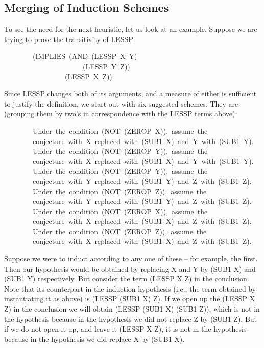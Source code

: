 \documentclass[10pt]{book}
\newenvironment{pubasis}{\begin{flushleft}}{\end{flushleft}}
\begin{document}
\subsection{Merging of Induction Schemes}
To see the need for the next heuristic, let us look at an
example.  Suppose we are trying to prove the transitivity of LESSP:
\begin{pubasis}
~~~~~~~~(IMPLIES~(AND~(LESSP~X~Y)\\
~~~~~~~~~~~~~~~~~~~~~~(LESSP~Y~Z))\\
~~~~~~~~~~~~~~~~~(LESSP~X~Z)).\\
\end{pubasis}
Since LESSP changes both of its arguments, and a measure of either is sufficient to
justify the definition, we start out with six suggested schemes.
They are (grouping them by two's in correspondence with the
LESSP terms above):
\begin{pubasis}
~~~~~~~~Under~the~condition~(NOT~(ZEROP~X)),~assume~the\\
~~~~~~~~conjecture~with~X~replaced~with~(SUB1~X)~and~Y~with~(SUB1~Y).\\

~~~~~~~~Under~the~condition~(NOT~(ZEROP~Y)),~assume~the\\
~~~~~~~~conjecture~with~X~replaced~with~(SUB1~X)~and~Y~with~(SUB1~Y).\\

~~~~~~~~Under~the~condition~(NOT~(ZEROP~Y)),~assume~the\\
~~~~~~~~conjecture~with~Y~replaced~with~(SUB1~Y)~and~Z~with~(SUB1~Z).\\

~~~~~~~~Under~the~condition~(NOT~(ZEROP~Z)),~assume~the\\
~~~~~~~~conjecture~with~Y~replaced~with~(SUB1~Y)~and~Z~with~(SUB1~Z).\\

~~~~~~~~Under~the~condition~(NOT~(ZEROP~X)),~assume~the\\
~~~~~~~~conjecture~with~X~replaced~with~(SUB1~X)~and~Z~with~(SUB1~Z).\\

~~~~~~~~Under~the~condition~(NOT~(ZEROP~Z)),~assume~the\\
~~~~~~~~conjecture~with~X~replaced~with~(SUB1~X)~and~Z~with~(SUB1~Z).\\
\end{pubasis}
Suppose we were to induct according to any one of these -- for
example, the first.  Then our hypothesis would be obtained by replacing
X and Y by (SUB1 X) and (SUB1 Y) respectively.  But consider
the term (LESSP X Z) in the conclusion.  Note that its counterpart in the
induction hypothesis (i.e., the term obtained by instantiating
it as above) is (LESSP (SUB1 X) Z).  If we open  up the (LESSP X Z) in the conclusion
we will obtain (LESSP (SUB1 X) (SUB1 Z)), which is not in the hypothesis
because in the hypothesis we did not replace Z by (SUB1 Z).  But if we do not open
it up, and leave it (LESSP X Z), it is not in the hypothesis because in the hypothesis we
did replace X by (SUB1 X).
\end{document}
